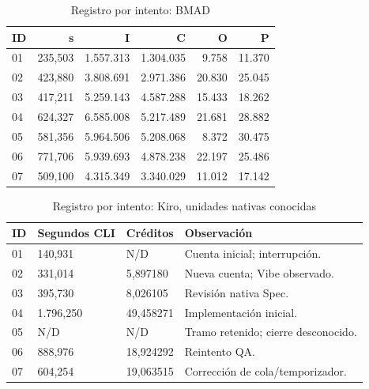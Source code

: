\begin{table}[H]\centering\small\setlength{\tabcolsep}{4pt}\renewcommand{\arraystretch}{1.06}
\caption{Registro por intento: BMAD}
\label{tab:sesiones_bmad_tetris_e2}
\begin{tabular*}{\textwidth}{@{\extracolsep{\fill}}l r r r r r}\toprule

\textbf{ID} & \textbf{s} & \textbf{I} & \textbf{C} & \textbf{O} & \textbf{P} \\ \midrule

01 & 235,503 & 1.557.313 & 1.304.035 & 9.758 & 11.370 \\

02 & 423,880 & 3.808.691 & 2.971.386 & 20.830 & 25.045 \\

03 & 417,211 & 5.259.143 & 4.587.288 & 15.433 & 18.262 \\

04 & 624,327 & 6.585.008 & 5.217.489 & 21.681 & 28.882 \\

05 & 581,356 & 5.964.506 & 5.208.068 & 8.372 & 30.475 \\

06 & 771,706 & 5.939.693 & 4.878.238 & 22.197 & 25.486 \\

07 & 509,100 & 4.315.349 & 3.340.029 & 11.012 & 17.142 \\

\bottomrule\end{tabular*}

\end{table}

\begin{table}[H]\centering\small\setlength{\tabcolsep}{4pt}\renewcommand{\arraystretch}{1.06}
\caption{Registro por intento: Kiro, unidades nativas conocidas}
\label{tab:sesiones_kiro_tetris_e2}
\begin{tabularx}{\textwidth}{l Y Y Y}\toprule

\textbf{ID} & \textbf{Segundos CLI} & \textbf{Créditos} & \textbf{Observación} \\ \midrule

01 & 140,931 & N/D & Cuenta inicial; interrupción. \\

02 & 331,014 & 5,897180 & Nueva cuenta; Vibe observado. \\

03 & 395,730 & 8,026105 & Revisión nativa Spec. \\

04 & 1.796,250 & 49,458271 & Implementación inicial. \\

05 & N/D & N/D & Tramo retenido; cierre desconocido. \\

06 & 888,976 & 18,924292 & Reintento QA. \\

07 & 604,254 & 19,063515 & Corrección de cola/temporizador. \\

\bottomrule\end{tabularx}

\end{table}

